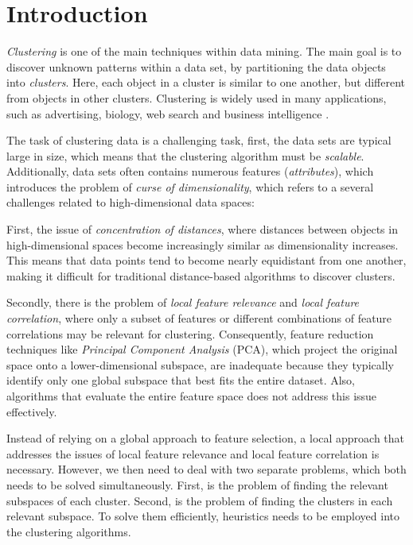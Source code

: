 \section{Introduction}
\textit{Clustering} is one of the main techniques within data mining. The main goal is to discover unknown patterns within a data set, by partitioning the data objects into \textit{clusters}. Here, each object in a cluster is similar to one another, but different from objects in other clusters. Clustering is widely used in many applications, such as advertising, biology, web search and business intelligence \cite[p.~444]{han-2011}.

The task of clustering data is a challenging task, first, the data sets are typical large in size, which means that the clustering algorithm must be \textit{scalable}. Additionally, data sets often contains numerous features (\textit{attributes}), which introduces the problem of \textit{curse of dimensionality}, which refers to a several challenges related to high-dimensional data spaces:

First, the issue of \textit{concentration of distances}, where distances between objects in high-dimensional spaces become increasingly similar as dimensionality increases. This means that data points tend to become nearly equidistant from one another, making it difficult for traditional distance-based algorithms to discover clusters.

Secondly, there is the problem of \textit{local feature relevance} and \textit{local feature correlation}, where only a subset of features or different combinations of feature correlations may be relevant for clustering. Consequently, feature reduction techniques like \textit{Principal Component Analysis} (PCA), which project the original space onto a lower-dimensional subspace, are inadequate because they typically identify only one global subspace that best fits the entire dataset. Also, algorithms that evaluate the entire feature space does not address this issue effectively. \cite[p.~43--46]{kriegel-2009}

Instead of relying on a global approach to feature selection, a local approach that addresses the issues of local feature relevance and local feature correlation is necessary. However, we then need to deal with two separate problems, which both needs to be solved simultaneously. First, is the problem of finding the relevant subspaces of each cluster. Second, is the problem of finding the clusters in each relevant subspace. To solve them efficiently, heuristics needs to be employed into the clustering algorithms. \cite[p.~6--7]{kriegel-2009}

